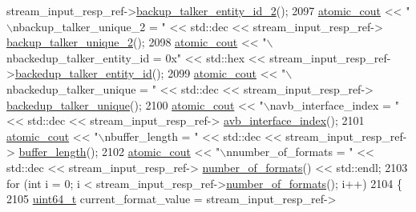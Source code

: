 \begin{DoxyCode}
      stream\_input\_resp\_ref->\hyperlink{classavdecc__lib_1_1stream__input__descriptor__response_a76daa1a16a93fd2abd3613bea816af5f}{backup\_talker\_entity\_id\_2}();
2097             \hyperlink{cmd__line_8h_a0bc38ccc65c79ba06c6fcd7b4bf554c3}{atomic\_cout} << \textcolor{stringliteral}{"\(\backslash\)nbackup\_talker\_unique\_2 = "} << std::dec << stream\_input\_resp\_ref->
      \hyperlink{classavdecc__lib_1_1stream__input__descriptor__response_a6c91e59896d8e1d08c3cf676a78caa53}{backup\_talker\_unique\_2}();
2098             \hyperlink{cmd__line_8h_a0bc38ccc65c79ba06c6fcd7b4bf554c3}{atomic\_cout} << \textcolor{stringliteral}{"\(\backslash\)nbackedup\_talker\_entity\_id = 0x"} << std::hex << 
      stream\_input\_resp\_ref->\hyperlink{classavdecc__lib_1_1stream__input__descriptor__response_ae7d527febcff1dc1fa228cc197cf8e44}{backedup\_talker\_entity\_id}();
2099             \hyperlink{cmd__line_8h_a0bc38ccc65c79ba06c6fcd7b4bf554c3}{atomic\_cout} << \textcolor{stringliteral}{"\(\backslash\)nbackedup\_talker\_unique = "} << std::dec << stream\_input\_resp\_ref->
      \hyperlink{classavdecc__lib_1_1stream__input__descriptor__response_a76c462953d0e3431cba9efb6d8ae5a87}{backedup\_talker\_unique}();
2100             \hyperlink{cmd__line_8h_a0bc38ccc65c79ba06c6fcd7b4bf554c3}{atomic\_cout} << \textcolor{stringliteral}{"\(\backslash\)navb\_interface\_index = "} << std::dec << stream\_input\_resp\_ref->
      \hyperlink{classavdecc__lib_1_1stream__input__descriptor__response_a8a84689147c9ee2278a6d3692b1c5bb1}{avb\_interface\_index}();
2101             \hyperlink{cmd__line_8h_a0bc38ccc65c79ba06c6fcd7b4bf554c3}{atomic\_cout} << \textcolor{stringliteral}{"\(\backslash\)nbuffer\_length = "} << std::dec << stream\_input\_resp\_ref->
      \hyperlink{classavdecc__lib_1_1stream__input__descriptor__response_a659139f2462ec36f08178dff106e184d}{buffer\_length}();
2102             \hyperlink{cmd__line_8h_a0bc38ccc65c79ba06c6fcd7b4bf554c3}{atomic\_cout} << \textcolor{stringliteral}{"\(\backslash\)nnumber\_of\_formats = "} << std::dec << stream\_input\_resp\_ref->
      \hyperlink{classavdecc__lib_1_1stream__input__descriptor__response_a55d221ca29bf6acce7d7031b811bae01}{number\_of\_formats}() << std::endl;
2103             \textcolor{keywordflow}{for} (\textcolor{keywordtype}{int} i = 0; i < stream\_input\_resp\_ref->\hyperlink{classavdecc__lib_1_1stream__input__descriptor__response_a55d221ca29bf6acce7d7031b811bae01}{number\_of\_formats}(); i++)
2104             \{
2105                 \hyperlink{parse_8c_aec6fcb673ff035718c238c8c9d544c47}{uint64\_t} current\_format\_value = stream\_input\_resp\_ref->

\end{DoxyCode}
